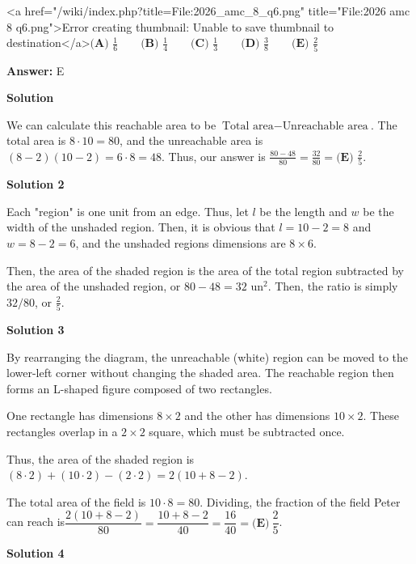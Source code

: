 \begin{enumerate}
 <a href="/wiki/index.php?title=File:2026\_amc\_8\_q6.png" title="File:2026 amc 8 q6.png">Error creating thumbnail: Unable to save thumbnail to destination</a>$\textbf{(A) } \frac{1}{6}\qquad\textbf{(B) } \frac{1}{4}\qquad\textbf{(C) } \frac{1}{3}\qquad\textbf{(D) } \frac{3}{8}\qquad\textbf{(E) } \frac{2}{5}\qquad$

 \textbf{Answer: }E



\textbf{Solution}

We can calculate this reachable area to be $\text{Total area} - \text{Unreachable area}$. The total area is $8 \cdot 10 = 80$, and the unreachable area is $(8-2)(10-2) = 6\cdot 8 = 48$. Thus, our answer is $\frac{80-48}{80} = \frac{32}{80} = \boxed{ \textbf{(E) } \frac{2}{5} }$.

 



\textbf{Solution 2}

Each "region" is one unit from an edge. Thus, let $l$ be the length and $w$ be the width of the unshaded region. Then, it is obvious that $l = 10 - 2 = 8$ and $w = 8 - 2 = 6$, and the unshaded regions dimensions are $8 \times 6$.

 Then, the area of the shaded region is the area of the total region subtracted by the area of the unshaded region, or $80 - 48 = 32$ $\text{un}^2$. Then, the ratio is simply $32/80$, or $\boxed{\frac{2}{5}}$.

 



\textbf{Solution 3}

By rearranging the diagram, the unreachable (white) region can be moved to the lower-left corner without changing the shaded area. The reachable region then forms an L-shaped figure composed of two rectangles.

 One rectangle has dimensions $8\times 2$ and the other has dimensions $10\times 2$. These rectangles overlap in a $2\times 2$ square, which must be subtracted once.

 Thus, the area of the shaded region is$(8\cdot 2)+(10\cdot 2)-(2\cdot 2)=2(10+8-2)$.

 The total area of the field is $10\cdot 8=80$. Dividing, the fraction of the field Peter can reach is$\dfrac{2(10+8-2)}{80}=\dfrac{10+8-2}{40}=\dfrac{16}{40}=\boxed{\textbf{(E)}\ \dfrac{2}{5}}$.

 



\textbf{Solution 4}


\end{enumerate}
